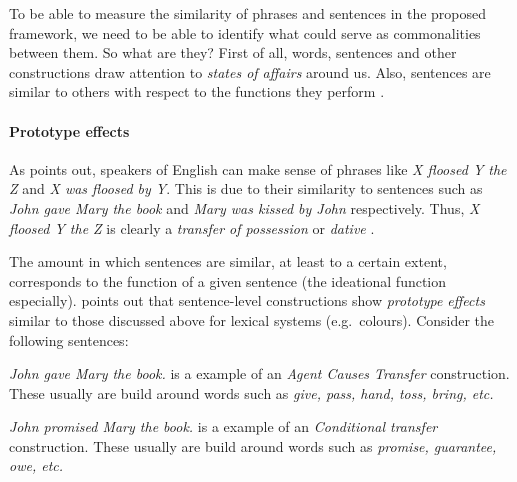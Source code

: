 \documentclass[11pt]{article}
\begin{document}
To be able to measure the similarity of phrases and sentences in the proposed framework, we need to be able to identify what could serve as commonalities between them. So what are they? First of all, words, sentences and other constructions draw attention to \emph{states of affairs} around us. Also, sentences are similar to others with respect to the functions they perform \cite[p. 288]{Winograd1983}. 

\paragraph{Prototype effects}

As  points out, speakers of English can make sense of phrases like \textit{X floosed Y the Z} and \textit{X was floosed by Y}. This is due to their similarity to sentences such as \textit{John gave Mary the book} and \textit{Mary was kissed by John} respectively. Thus, \textit{X floosed Y the Z} is clearly a \emph{transfer of possession} or \emph{dative} \cite{bresnan2007predicting}.

The amount in which sentences are similar, at least to a certain extent, corresponds to the function of a given sentence (the ideational function \cite[p. 288]{Winograd1983} especially).  points out that sentence-level constructions show \emph{prototype effects} similar to those discussed above for lexical systems (e.g.~colours). Consider the following sentences:
\begin{compactitem}
    \item \textit{John gave Mary the book.} is a example of an \emph{Agent Causes Transfer} construction. These usually are build around words such as \textit{give, pass, hand, toss, bring, etc.}
      \item \textit{John promised Mary the book.} is a example of an \emph{Conditional transfer} construction. These usually are build around words such as \textit{promise, guarantee, owe, etc.}
\end{compactitem}
\end{document}
